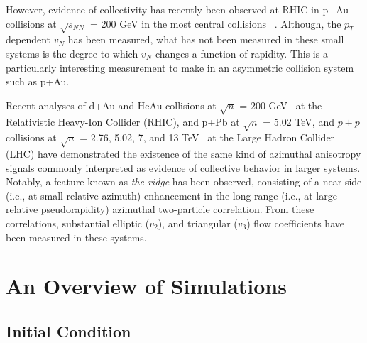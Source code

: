 However, evidence of collectivity has recently been observed at RHIC in p+Au collisions at $\sqrt{s_{NN}}$ = 200 GeV in the most central collisions ~\cite{PhysRevLett.115.142301}. Although, the $p_T$ dependent $v_N$ has been measured, what has not been measured in these small systems is the degree to which $v_N$ changes a function of rapidity. This is a particularly interesting measurement to make in an asymmetric collision system such as p+Au.

Recent analyses of d+Au and HeAu collisions at $\sqrt{n}$ = 200 GeV~\cite{PhysRevLett.111.212301,Adare:2014keg,Adare:2015ctn,Adamczyk:2014fcx} at the Relativistic Heavy-Ion Collider (RHIC), and p+Pb at $\sqrt{n}$ = 5.02 TeV, and $p+p$ collisions at $\sqrt{n}$ = 2.76, 5.02, 7, and 13 TeV~\cite{alice_long_2013,atlas_observation_2012,cms_observation_2012,Khachatryan:2015lva,Aad:2015gqa,Khachatryan:2010gv,Khachatryan:2016txc} at the Large Hadron Collider (LHC) have demonstrated the existence of the same kind of azimuthal anisotropy signals commonly interpreted as evidence of collective behavior in larger systems. Notably, a feature known as \textit{the ridge} has been observed, consisting of a near-side (i.e., at small relative azimuth) enhancement in the long-range (i.e., at large relative pseudorapidity) azimuthal two-particle correlation. From these correlations, substantial elliptic ($v_2$), and triangular ($v_3$) flow coefficients have been measured in these systems.

\section{An Overview of Simulations}

\subsection{Initial Condition}
